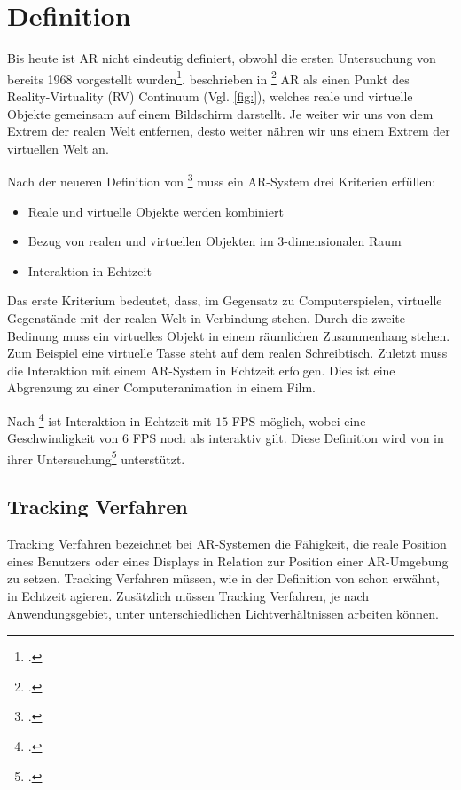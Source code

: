 \section{Definition} %
\label{sec:definition}
\begin{comment}
	Definiere Begriffe der Augmented Reality und Bildverarbeitung, die dem Leser nicht geläufig sind. Denke dabei an Prof. Klocke als Leser ohne besonderen Kenntnisstand in der AR/Bildverarbeitung.

	Azuma Definition der AR
	Milgram + Kishino MR oder nur Milgram Definition MR
\end{comment}

Bis heute ist \gls{AR} nicht eindeutig definiert, obwohl die ersten Untersuchung von \citeauthor{sutherland} bereits
 1968 vorgestellt wurden\footcite{sutherland}. \citeauthor{milgram94b} beschrieben in
 \footcite{milgram94b} \gls{AR} als einen Punkt des Reality-Virtuality (RV) Continuum
 (Vgl. \autoref{fig:}), welches reale und virtuelle Objekte gemeinsam auf einem Bildschirm darstellt. Je weiter wir uns
 von dem Extrem der realen Welt entfernen, desto weiter nähren wir uns einem Extrem der virtuellen Welt an.

Nach der neueren Definition von \citeauthor{azuma97}\footcite{azuma97} muss ein \gls{AR}-System drei Kriterien
 erfüllen:
\begin{itemize}
	\item Reale und virtuelle Objekte werden kombiniert
	\item Bezug von realen und virtuellen Objekten im 3-dimensionalen Raum
	\item Interaktion in Echtzeit
\end{itemize}
Das erste Kriterium bedeutet, dass, im Gegensatz zu Computerspielen, virtuelle Gegenstände mit der realen Welt in
 Verbindung stehen. Durch die zweite Bedinung muss ein virtuelles Objekt in einem räumlichen Zusammenhang stehen. Zum
 Beispiel eine virtuelle Tasse steht auf dem realen Schreibtisch. Zuletzt muss die Interaktion mit einem
 \gls{AR}-System in Echtzeit erfolgen. Dies ist eine Abgrenzung zu einer Computeranimation in einem Film.

Nach \citeauthor{moeller2008}\footcite[Vgl.][S.~1]{moeller2008} ist Interaktion in Echtzeit mit $15$ FPS möglich, wobei
 eine Geschwindigkeit von $6$ FPS noch als interaktiv gilt. Diese Definition wird von \citeauthor{wagner09b} in ihrer
 Untersuchung\footcite[Vgl.][S.~8--9]{wagner09b} unterstützt.

\subsection{Tracking Verfahren} %
\label{sec:tracking_verfahren}
Tracking Verfahren bezeichnet bei \gls{AR}-Systemen die Fähigkeit, die reale Position eines Benutzers oder eines
 Displays in Relation zur Position einer \gls{AR}-Umgebung zu setzen. Tracking Verfahren müssen, wie in der Definition
 von \citeauthor{azuma97} schon erwähnt, in Echtzeit agieren. Zusätzlich müssen Tracking Verfahren, je nach
 Anwendungsgebiet, unter unterschiedlichen Lichtverhältnissen arbeiten können.

